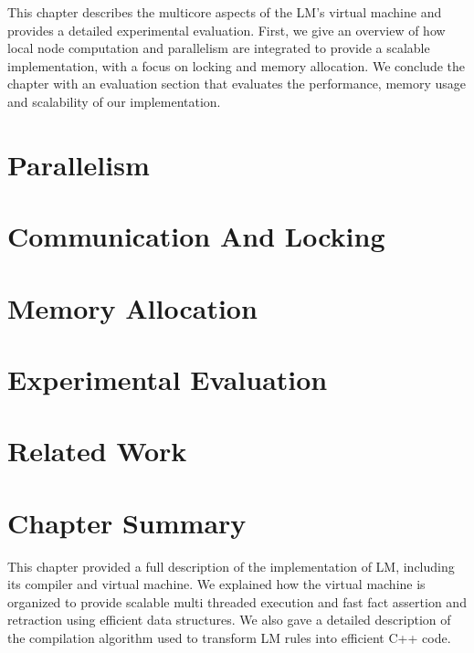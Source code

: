 This chapter describes the multicore aspects of the LM's virtual machine and
provides a detailed experimental evaluation. First, we give an overview of how
local node computation and parallelism are integrated to provide a scalable
implementation, with a focus on locking and memory allocation. We conclude the
chapter with an evaluation section that evaluates the performance, memory usage
and scalability of our implementation.

\section{Parallelism}\label{sec:implementation:parallelism}


\section{Communication And Locking}


\section{Memory Allocation}


\section{Experimental Evaluation}


\section{Related Work}



\section{Chapter Summary}

This chapter provided a full description of the implementation of LM, including
its compiler and virtual machine. We explained how the virtual machine is
organized to provide scalable multi threaded execution and fast fact assertion
and retraction using efficient data structures. We also gave a detailed
description of the compilation algorithm used to transform LM rules into
efficient C++ code.

